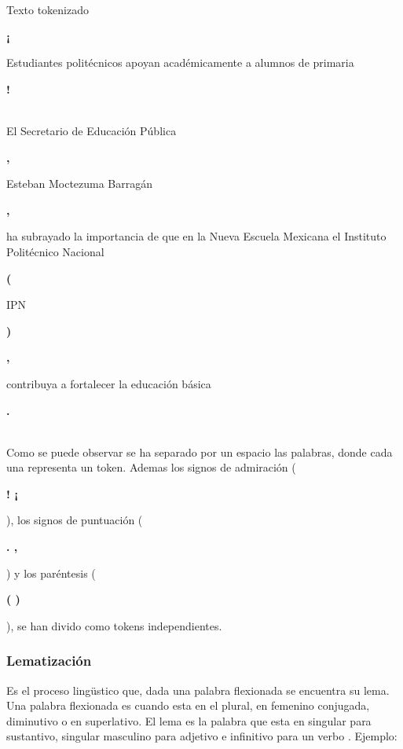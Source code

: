 \begin{mygraybox}[label={box:cp3:tokenizado}]{Texto tokenizado} 
\begin{large}\textbf{¡}\end{large} Estudiantes politécnicos apoyan académicamente a alumnos de primaria \begin{large}\textbf{!}\end{large}\\

El Secretario de Educación Pública \begin{Large}\textbf{,}\end{Large} Esteban Moctezuma Barragán \begin{Large}\textbf{,}\end{Large} ha subrayado la importancia  de que en la Nueva Escuela Mexicana el Instituto Politécnico Nacional \begin{Large}\textbf{(}\end{Large} IPN \begin{Large}\textbf{)}\end{Large} \begin{Large}\textbf{,}\end{Large} contribuya a fortalecer la educación básica \begin{Large}\textbf{.}\end{Large}
\end{mygraybox}
\ \\
Como se puede observar se ha separado por un espacio las palabras, donde cada una representa un token. Ademas los signos de admiración (\begin{large}\textbf{! ¡}\end{large}), los signos de puntuación (\begin{large}\textbf{. ,}\end{large}) y los paréntesis (\begin{large}\textbf{( )}\end{large}), se han divido como tokens independientes.


\subsubsection{Lematización}

Es el proceso lingüstico que, dada una palabra flexionada se encuentra su
lema. Una palabra flexionada es cuando esta en el plural, en femenino conjugada,
diminutivo o en superlativo. El lema es la palabra que esta en singular para
sustantivo, singular masculino para adjetivo e infinitivo para un verbo \citep{CT13}. Ejemplo:

